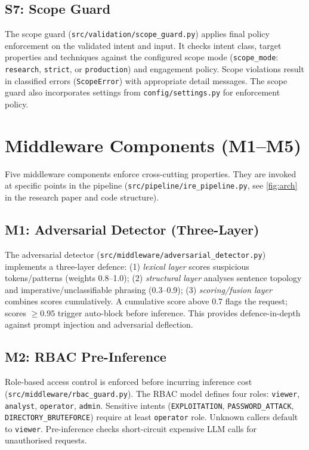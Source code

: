\subsection{S7: Scope Guard}

The scope guard (\texttt{src/validation/scope\_guard.py}) applies final policy enforcement on the validated intent and input. It checks intent class, target properties and techniques against the configured scope mode (\texttt{scope\_mode}: \texttt{research}, \texttt{strict}, or \texttt{production}) and engagement policy. Scope violations result in classified errors (\texttt{ScopeError}) with appropriate detail messages. The scope guard also incorporates settings from \texttt{config/settings.py} for enforcement policy.

\section{Middleware Components (M1--M5)}\label{sec:method-middleware}

Five middleware components enforce cross-cutting properties. They are invoked at specific points in the pipeline (\texttt{src/pipeline/ire\_pipeline.py}, see \cref{fig:arch} in the research paper and code structure).

\subsection{M1: Adversarial Detector (Three-Layer)}

The adversarial detector (\texttt{src/middleware/adversarial\_detector.py}) implements a three-layer defence: (1) \textit{lexical layer} scores suspicious tokens/patterns (weights 0.8--1.0); (2) \textit{structural layer} analyses sentence topology and imperative/unclassifiable phrasing (0.3--0.9); (3) \textit{scoring/fusion layer} combines scores cumulatively. A cumulative score above 0.7 flags the request; scores $\ge 0.95$ trigger auto-block before inference. This provides defence-in-depth against prompt injection and adversarial deflection.

\subsection{M2: RBAC Pre-Inference}

Role-based access control is enforced before incurring inference cost (\texttt{src/middleware/rbac\_guard.py}). The RBAC model defines four roles: \texttt{viewer}, \texttt{analyst}, \texttt{operator}, \texttt{admin}. Sensitive intents (\texttt{EXPLOITATION}, \texttt{PASSWORD\_ATTACK}, \texttt{DIRECTORY\_BRUTEFORCE}) require at least \texttt{operator} role. Unknown callers default to \texttt{viewer}. Pre-inference checks short-circuit expensive LLM calls for unauthorised requests.

